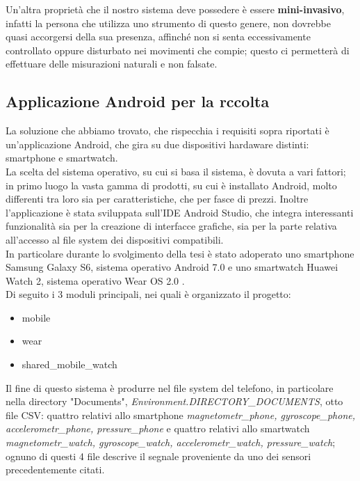 \documentclass[a4paper]{article}
\begin{document}
\makebox[\linewidth]{}
\makebox[\linewidth]{}
Un'altra proprietà che il nostro sistema deve possedere è essere \textbf{mini-invasivo}, infatti la persona che utilizza uno strumento di questo genere, non dovrebbe quasi accorgersi della sua presenza, affinché non si senta eccessivamente controllato oppure disturbato nei movimenti che compie; questo ci permetterà di effettuare delle misurazioni naturali e non falsate.


	\subsection{Applicazione Android per la rccolta}
La soluzione che abbiamo trovato, che rispecchia i requisiti sopra riportati è un'applicazione Android, che gira su due dispositivi hardaware distinti: smartphone e smartwatch. \\ 
La scelta del sistema operativo, su cui si basa il sistema, è dovuta a vari fattori; in primo luogo la vasta gamma di prodotti, su cui è installato Android, molto differenti tra loro sia per caratteristiche, che per fasce di prezzi. Inoltre l'applicazione è stata sviluppata sull’IDE Android Studio, che integra interessanti funzionalità sia per la creazione di interfacce grafiche, sia per la parte relativa all’accesso al file system dei dispositivi compatibili. \\
In particolare durante lo svolgimento della tesi è stato adoperato uno smartphone Samsung Galaxy S6, sistema operativo Android 7.0 e uno smartwatch Huawei Watch 2, sistema operativo Wear OS 2.0 . \\
Di seguito i 3 moduli principali, nei quali è organizzato il progetto:
\begin{itemize}
\item mobile
\item wear
\item shared\_mobile\_watch \\
\end{itemize}
Il fine di questo sistema è produrre nel file system del telefono, in particolare nella directory "Documents", \textit{Environment.DIRECTORY\_DOCUMENTS}, otto file CSV: quattro relativi allo smartphone \textit{magnetometr\_phone, gyroscope\_phone, accelerometr\_phone, pressure\_phone} e quattro relativi allo smartwatch \textit{magnetometr\_watch, gyroscope\_watch, accelerometr\_watch, pressure\_watch}; ognuno di questi 4 file descrive il segnale proveniente da uno dei sensori precedentemente citati. \\
\end{document}
